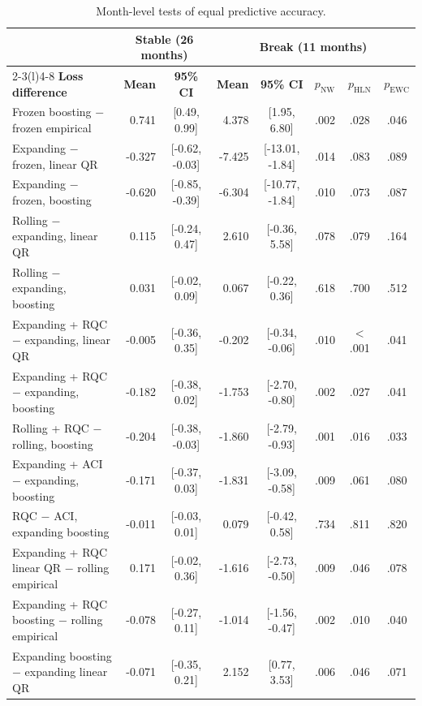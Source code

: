 \begin{table}[t]
\caption{Month-level tests of equal predictive accuracy.\label{tab:tests}}
\centering\footnotesize\setlength{\tabcolsep}{3pt}
\begin{tabular*}{\textwidth}{@{\extracolsep\fill}lrcrcccc@{}}
\toprule
 & \multicolumn{2}{c}{\textbf{Stable (26 months)}} & \multicolumn{5}{c}{\textbf{Break (11 months)}} \\
\cmidrule(lr){2-3}\cmidrule(l){4-8}
\textbf{Loss difference} & \textbf{Mean} & \textbf{95\% CI} & \textbf{Mean} & \textbf{95\% CI} & \textbf{$p_{\mathrm{NW}}$} & \textbf{$p_{\mathrm{HLN}}$} & \textbf{$p_{\mathrm{EWC}}$} \\
\midrule
Frozen boosting $-$ frozen empirical & 0.741 & [0.49, 0.99] & 4.378 & [1.95, 6.80] & .002 & .028 & .046 \\
Expanding $-$ frozen, linear QR & -0.327 & [-0.62, -0.03] & -7.425 & [-13.01, -1.84] & .014 & .083 & .089 \\
Expanding $-$ frozen, boosting & -0.620 & [-0.85, -0.39] & -6.304 & [-10.77, -1.84] & .010 & .073 & .087 \\
Rolling $-$ expanding, linear QR & 0.115 & [-0.24, 0.47] & 2.610 & [-0.36, 5.58] & .078 & .079 & .164 \\
Rolling $-$ expanding, boosting & 0.031 & [-0.02, 0.09] & 0.067 & [-0.22, 0.36] & .618 & .700 & .512 \\
Expanding + RQC $-$ expanding, linear QR & -0.005 & [-0.36, 0.35] & -0.202 & [-0.34, -0.06] & .010 & $<$.001 & .041 \\
Expanding + RQC $-$ expanding, boosting & -0.182 & [-0.38, 0.02] & -1.753 & [-2.70, -0.80] & .002 & .027 & .041 \\
Rolling + RQC $-$ rolling, boosting & -0.204 & [-0.38, -0.03] & -1.860 & [-2.79, -0.93] & .001 & .016 & .033 \\
Expanding + ACI $-$ expanding, boosting & -0.171 & [-0.37, 0.03] & -1.831 & [-3.09, -0.58] & .009 & .061 & .080 \\
RQC $-$ ACI, expanding boosting & -0.011 & [-0.03, 0.01] & 0.079 & [-0.42, 0.58] & .734 & .811 & .820 \\
Expanding + RQC linear QR $-$ rolling empirical & 0.171 & [-0.02, 0.36] & -1.616 & [-2.73, -0.50] & .009 & .046 & .078 \\
Expanding + RQC boosting $-$ rolling empirical & -0.078 & [-0.27, 0.11] & -1.014 & [-1.56, -0.47] & .002 & .010 & .040 \\
Expanding boosting $-$ expanding linear QR & -0.071 & [-0.35, 0.21] & 2.152 & [0.77, 3.53] & .006 & .046 & .071 \\

\end{tabular*}
\end{table}
